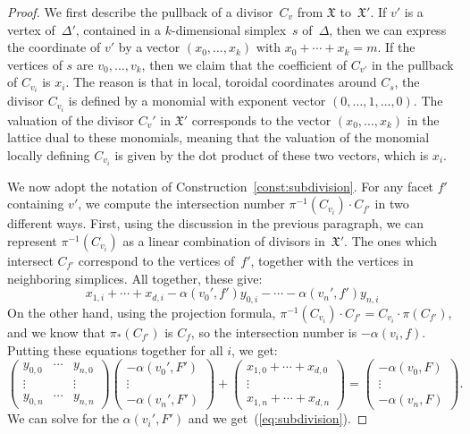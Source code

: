 \documentclass[11pt]{amsart}
\theoremstyle{definition}
\newcommand{\X}{\mathfrak X}
\begin{document}
\begin{proof}
We first describe the pullback of a divisor~$C_v$ from $\X$ to~$\X'$. If $v'$ is
a vertex of~$\Delta'$, contained in a $k$-dimensional simplex~$s$ of~$\Delta$,
then we can express the coordinate of $v'$ by a vector $(x_0, \ldots, x_k)$ with
$x_0 + \cdots + x_k = m$. If the vertices of $s$ are $v_0, \ldots, v_k$, then we
claim that the coefficient of $C_{v'}$ in the pullback of $C_{v_i}$ is $x_i$.
The reason is that in local, toroidal coordinates around $C_{s}$, the divisor
$C_{v_i}$ is defined by a monomial with exponent vector $(0, \ldots, 1, \ldots,
0)$. The valuation of the divisor $C_v'$ in $\X'$ corresponds to the vector
$(x_0, \ldots, x_k)$ in the lattice dual to these monomials, meaning that the
valuation of the monomial locally defining $C_{v_i}$ is given by the dot
product of these two vectors, which is $x_i$.

We now adopt the notation of Construction~\ref{const:subdivision}. For any facet
$f'$ containing $v'$, we compute
the intersection number
$\pi^{-1}(C_{v_i}) \cdot C_{f'}$ in two different ways. First, using the
discussion in the previous paragraph, we can represent $\pi^{-1}(C_{v_i})$ as a
linear combination of divisors in~$\X'$. The ones which intersect $C_{f'}$
correspond to the vertices of~$f'$, together with the vertices in neighboring
simplices. All together, these give:
\begin{equation*}
x_{1,i} + \cdots + x_{d,i} -
\alpha(v_0', f') y_{0,i} - \cdots - \alpha(v_n', f') y_{n,i}
\end{equation*}
On the other hand, using the projection formula, $\pi^{-1}(C_{v_i}) \cdot
C_{f'} = C_{v_i} \cdot \pi(C_{f'})$, and we know that $\pi_*(C_{f'})$ is $C_f$,
so the intersection number is $-\alpha(v_i, f)$. Putting these equations
together for all $i$, we get:
\begin{equation*}
\begin{pmatrix}
y_{0,0} & \cdots & y_{n,0} \\
\vdots & & \vdots \\
y_{0,n} & \cdots & y_{n,n}
\end{pmatrix}
\begin{pmatrix} -\alpha(v_0', F') \\ \vdots \\ -\alpha(v_n', F') \end{pmatrix}
+ \begin{pmatrix}
x_{1,0} + \cdots + x_{d,0} \\
\vdots \\
x_{1,n} + \cdots + x_{d,n}
\end{pmatrix}
=
\begin{pmatrix} -\alpha(v_0, F) \\ \vdots \\ -\alpha(v_n, F) \end{pmatrix}.
\end{equation*}
We can solve for the $\alpha(v_i', F')$ and we get~(\ref{eq:subdivision}).
\end{proof}
\end{document}
